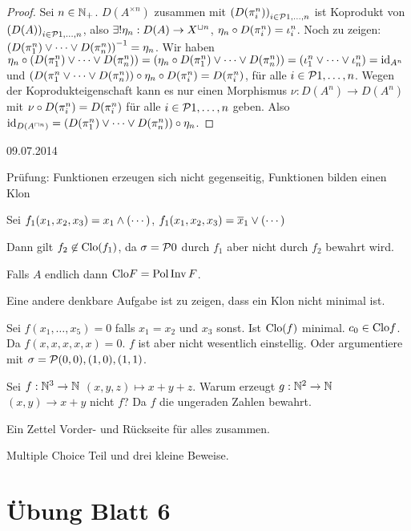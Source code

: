 \documentclass{book}
\begin{document}
\begin{proof}
    Sei $n\in\mathbb{N}_+$. $D(A^{\times n})$ zusammen mit ${(D(\pi^n_i))}_{i\in\set{1,\ldots,n}}$ ist Koprodukt von ${(D(A))}_{i\in\set{1,\ldots,n}}$, also $\exists !\eta_n: D(A)\rightarrow X^{\mathbin{\sqcup} n}$, $\eta_n\circ D(\pi^n_i)=\iota_i^n$.
    Noch zu zeigen: ${(D(\pi^n_1)\vee\cdots\vee D(\pi^n_n))}^{-1}=\eta_n$. Wir haben $\eta_n\circ(D(\pi^n_1)\vee\cdots\vee D(\pi^n_n))=(\eta_n\circ D(\pi^n_1)\vee\cdots\vee D(\pi^n_n))=(\iota^n_1\vee\cdots\vee\iota^n_n)=\mathop\mathrm{id}\nolimits_{A^n}$ und $(D(\pi^n_1\vee\cdots\vee D(\pi^n_n))\circ\eta_n\circ D(\pi^n_i)=D(\pi^n_i)$, für alle $i\in\set{1,\ldots,n}$. Wegen der Koprodukteigenschaft kann es nur einen Morphismus $\nu:D(A^n)\to D(A^n)$ mit $\nu\circ D(\pi^n_i)=D(\pi^n_i)$ für alle $i\in\set{1,\ldots,n}$ geben. Also $\mathop\mathrm{id}\nolimits_{D(A^{\mathbin{\sqcap} n})}=(D(\pi^n_1)\vee\cdots\vee D(\pi^n_n))\circ\eta_n$. 
\end{proof}

\hfill{09.07.2014}

Prüfung: Funktionen erzeugen sich nicht gegenseitig, Funktionen bilden einen Klon

\begin{example}
    Sei $f_1(x_1,x_2,x_3)=x_1\wedge(\cdots)$, $f_1(x_1,x_2,x_3)=\overline x_1\vee(\cdots)$ 
\end{example}

Dann gilt $f_2\not\in\mathrm{Clo}(f_1)$, da $\sigma=\set{0}$ durch $f_1$ aber nicht durch $f_2$ bewahrt wird.

Falls $A$ endlich dann $\mathrm{Clo} F=\mathop\mathrm{Pol}\mathop\mathrm{Inv} F$.

Eine andere denkbare Aufgabe ist zu zeigen, dass ein Klon nicht minimal ist.

\begin{example}
    Sei $f(x_1,\ldots,x_5)=0$ falls $x_1=x_2$ und $x_3$ sonst. Ist $\mathrm{Clo}(f)$ minimal. $c_0\in\mathrm{Clo} f$. Da $f(x,x,x,x,x)=0$. $f$ ist aber nicht wesentlich einstellig. Oder argumentiere
    mit $\sigma=\set{(0,0),(1,0),(1,1)}$.
\end{example}

Sei $f:\mathbb{N}^3\rightarrow\mathbb{N}$ $(x,y,z)\mapsto x+y+z$. Warum erzeugt $g:\mathbb{N}^2\rightarrow\mathbb{N}$ $(x,y)\to x+y$ nicht $f$? Da $f$ die ungeraden Zahlen bewahrt.

Ein Zettel Vorder- und Rückseite für alles zusammen.

Multiple Choice Teil und drei kleine Beweise.

\section{Übung Blatt 6}
\end{document}
